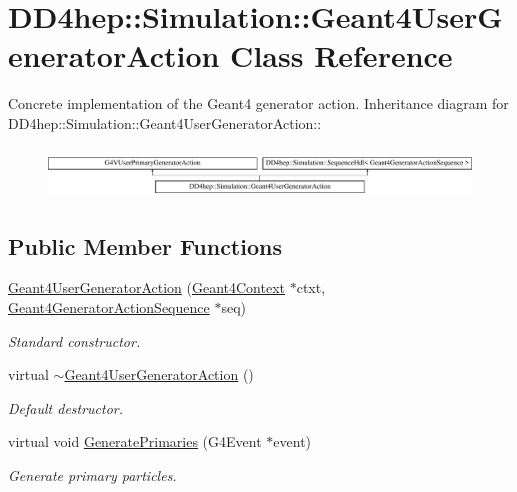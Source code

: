 \hypertarget{class_d_d4hep_1_1_simulation_1_1_geant4_user_generator_action}{
\section{DD4hep::Simulation::Geant4UserGeneratorAction Class Reference}
\label{class_d_d4hep_1_1_simulation_1_1_geant4_user_generator_action}
}


Concrete implementation of the Geant4 generator action.  
Inheritance diagram for DD4hep::Simulation::Geant4UserGeneratorAction::\begin{figure}[H]
\begin{center}
\leavevmode
\includegraphics[height=1.32388cm]{class_d_d4hep_1_1_simulation_1_1_geant4_user_generator_action}
\end{center}
\end{figure}
\subsection*{Public Member Functions}
\begin{DoxyCompactItemize}
\item 
\hyperlink{class_d_d4hep_1_1_simulation_1_1_geant4_user_generator_action_afc51c8fd156ae7c8a344d1378c2b2026}{Geant4UserGeneratorAction} (\hyperlink{class_d_d4hep_1_1_simulation_1_1_geant4_context}{Geant4Context} $\ast$ctxt, \hyperlink{class_d_d4hep_1_1_simulation_1_1_geant4_generator_action_sequence}{Geant4GeneratorActionSequence} $\ast$seq)
\begin{DoxyCompactList}\small\item\em Standard constructor. \item\end{DoxyCompactList}\item 
virtual \hyperlink{class_d_d4hep_1_1_simulation_1_1_geant4_user_generator_action_a4fa904700f82d5bcce7a2c5d774d529f}{$\sim$Geant4UserGeneratorAction} ()
\begin{DoxyCompactList}\small\item\em Default destructor. \item\end{DoxyCompactList}\item 
virtual void \hyperlink{class_d_d4hep_1_1_simulation_1_1_geant4_user_generator_action_a6e5a2cb71388c8358f6fa8679ca9cf69}{GeneratePrimaries} (G4Event $\ast$event)
\begin{DoxyCompactList}\small\item\em Generate primary particles. \item\end{DoxyCompactList}\end{DoxyCompactItemize}


